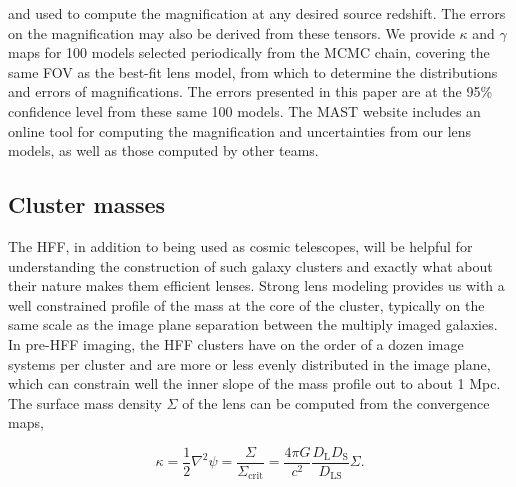 \noindent and used to compute the magnification at any desired source redshift. The errors on the magnification may also be derived from these tensors. We provide $\kappa$ and $\gamma$ maps for 100 models selected periodically from the MCMC chain, covering the same FOV as the best-fit lens model, from which to determine the distributions and errors of magnifications. The errors presented in this paper are at the 95\% confidence level from these same 100 models. The MAST website includes an online tool for computing the magnification and uncertainties from our lens models, as well as those computed by other teams.

%
%

\subsection{Cluster masses}

The HFF, in addition to being used as cosmic telescopes, will be helpful for understanding the construction of such galaxy clusters and exactly what about their nature makes them efficient lenses. Strong lens modeling provides us with a well constrained profile of the mass at the core of the cluster, typically on the same scale as the image plane separation between the multiply imaged galaxies. In pre-HFF imaging, the HFF clusters have on the order of a dozen image systems per cluster and are more or less evenly distributed in the image plane, which can constrain well the inner slope of the mass profile out to about 1 Mpc. The surface mass density $\Sigma$ of the lens can be computed from the convergence maps, 

\begin{equation}
\kappa = \frac{1}{2} \nabla^2 \psi = \frac{\Sigma}{\Sigma_\mathrm{crit}} = \frac{4\pi G}{c^2} \frac{D_\mathrm{L}D_\mathrm{S}}{D_\mathrm{LS}} \Sigma.
\end{equation}

